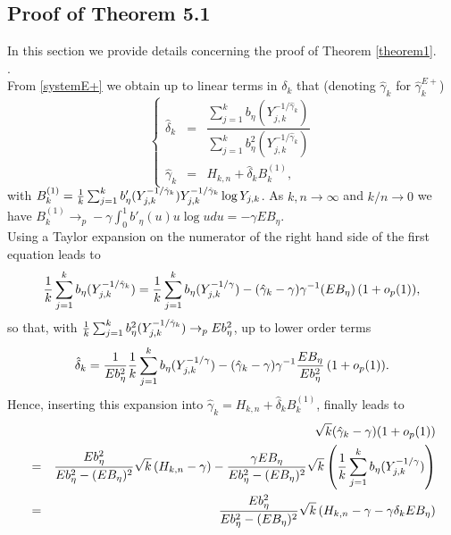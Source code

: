\begin{subappendices}
\section{Proof of Theorem 5.1}\label{appen1}

In this section we provide details concerning the proof of Theorem \ref{theorem1}. 
\\
. \\
From \eqref{systemE+} we obtain up to linear terms in $\delta_k$ that (denoting $\hat{\gamma}_k$ for $\hat{\gamma}^{E+}_k$)
\[
\left\{
\begin{array}{lcl}
\hat{\delta}_k &=& \dfrac{\sum_{j=1}^k b_\eta (Y_{j,k}^{-1/\hat{\gamma}_k})}{\sum_{j=1}^k b^2_\eta (Y_{j,k}^{-1/\hat{\gamma}_k})} \\
\hat{\gamma}_k &=& H_{k,n} + \hat{\delta}_k B^{(1)}_{k},
\end{array}
\right.
\]
with $B^{(1)}_{k}= {1 \over k}\sum_{j=1}^k b'_\eta (Y_{j,k}^{-1/\hat{\gamma}_k})Y_{j,k}^{-1/\hat{\gamma}_k}\log Y_{j,k}$. As $k,n \to \infty$ and $k/n \to 0$ we have $B^{(1)}_{k} \to_p -\gamma \int_0^1 b'_{\eta}(u) u \log u du = -\gamma EB_\eta$.
\\
Using a Taylor expansion on the numerator of the right hand side of the first equation leads to
\[
{1 \over k}\sum_{j=1}^k b_\eta (Y_{j,k}^{-1/\hat{\gamma}_k})
=
{1 \over k}\sum_{j=1}^k b_\eta (Y_{j,k}^{-1/\gamma})
- (\hat{\gamma}_k - \gamma) \gamma^{-1} (EB_\eta) \, (1+o_p(1)), 
\]
so that, with ${1 \over k}\sum_{j=1}^k b^2_\eta (Y_{j,k}^{-1/\hat{\gamma}_k}) \to_p E b^2_{\eta}$, up to lower order terms
\[
\hat{\delta}_k = {1 \over E b^2_{\eta}} {1 \over k}\sum_{j=1}^k b_\eta (Y_{j,k}^{-1/\gamma})
- (\hat{\gamma}_k - \gamma) \gamma^{-1}\dfrac{EB_\eta }{E b^2_{\eta}} \, (1+o_p(1)).
\]
Hence, inserting this expansion into $\hat{\gamma}_k = H_{k,n} + \hat{\delta}_k B^{(1)}_{k}$, 
finally leads to 
\begin{eqnarray*}
&&\sqrt{k}(\hat{\gamma}_k - \gamma)(1+o_p(1))\\&=&
\dfrac{E b^2_{\eta}}{E b^2_{\eta}-(EB_\eta)^2} \sqrt{k}\left(H_{k,n}-\gamma \right)
-
\dfrac{\gamma EB_\eta }{E b^2_{\eta}-(EB_\eta)^2 }\sqrt{k} \left( {1 \over k}\sum_{j=1}^k b_\eta (Y_{j,k}^{-1/\gamma})\right)\\
&=& \dfrac{E b^2_{\eta}}{E b^2_{\eta}-(EB_\eta)^2} \sqrt{k}\left(H_{k,n}-\gamma - \gamma \delta_k EB_\eta\right) 
\\ && \;\;

\end{eqnarray*}
\end{subappendices}
